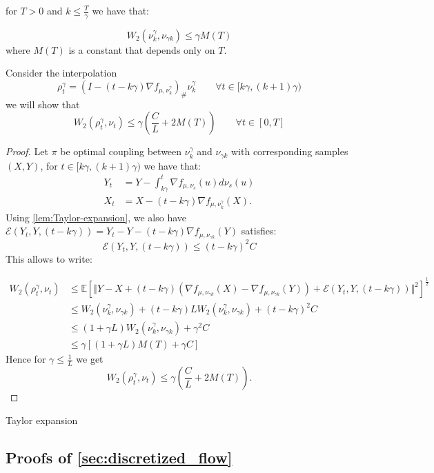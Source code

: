 %
\begin{proposition}

for $T>0$ and $k\leq\frac{T}{\gamma}$ we have that:

\[
W_{2}(\nu_{k}^{\gamma},\nu_{\gamma k})\leq\gamma M(T)
\]
where $M(T)$ is a constant that depends only on $T$.
\end{proposition}
Consider the interpolation 
\[
\rho_{t}^{\gamma}=(I-(t-k\gamma)\nabla f_{\mu,\nu_{k}^{\gamma}})_{\#}\nu_{k}^{\gamma}\qquad\forall t\in[k\gamma,(k+1)\gamma)
\]
we will show that 
\[
W_{2}(\rho_{t}^{\gamma},\nu_{t})\leq\gamma(\frac{C}{L}+2M(T))\qquad\forall t\in[0,T]
\]

\begin{proof}
Let $\pi$ be optimal coupling between $\nu_{k}^{\gamma}$ and $\nu_{\gamma k}$
with corresponding samples $(X,Y)$, for $t\in[k\gamma,(k+1)\gamma)$
we have that:
\begin{align*}
Y_{t} & =Y-\int_{k\gamma}^{t}\nabla f_{\mu,\nu_{s}}(u)d\nu_{s}(u)\\
X_{t} & =X-(t-k\gamma)\nabla f_{\mu,\nu_{k}^{\gamma}}(X).
\end{align*}
Using \ref{lem:Taylor-expansion}, we also have $\mathcal{E}(Y_{t},Y,(t-k\gamma))=Y_{t}-Y-(t-k\gamma)\nabla f_{\mu,\nu_{\gamma k}}(Y)$
satisfies:
\[
\mathcal{E}(Y_{t},Y,(t-k\gamma))\leq(t-k\gamma)^{2}C
\]
This allows to write:

\begin{align*}
W_{2}(\rho_{t}^{\gamma},\nu_{t}) & \leq\mathbb{E}\left[\Vert Y-X+(t-k\gamma)(\nabla f_{\mu,\nu_{\gamma k}}(X)-\nabla f_{\mu,\nu_{\gamma k}}(Y))+\mathcal{E}(Y_{t},Y,(t-k\gamma))\Vert^{2}\right]^{\frac{1}{2}}\\
 & \leq W_{2}(\nu_{k}^{\gamma},\nu_{\gamma k})+(t-k\gamma)LW_{2}(\nu_{k}^{\gamma},\nu_{\gamma k})+(t-k\gamma)^{2}C\\
 & \leq(1+\gamma L)W_{2}(\nu_{k}^{\gamma},\nu_{\gamma k})+\gamma^{2}C\\
 & \leq\gamma\left[(1+\gamma L)M(T)+\gamma C\right]
\end{align*}
Hence for $\gamma\leq\frac{1}{L}$ we get 
\[
W_{2}(\rho_{t}^{\gamma},\nu_{t})\leq\gamma(\frac{C}{L}+2M(T)).
\]
\end{proof}
\begin{lemma}
\label{lem:Taylor-expansion}Taylor expansion
\end{lemma}





\subsection{Proofs of \cref{sec:discretized_flow}}




